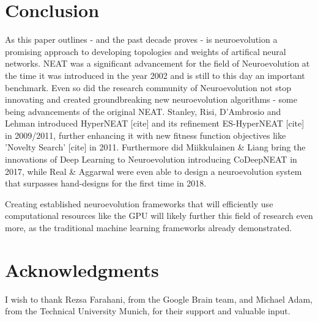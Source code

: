 \documentclass[journal, a4paper]{IEEEtran}
\begin{document}

\section{Conclusion}

As this paper outlines - and the past decade proves - is neuroevolution a promising approach to developing topologies and weights of artifical neural networks. NEAT was a significant advancement for the field of Neuroevolution at the time it was introduced in the year 2002 and is still to this day an important benchmark. Even so did the research community of Neuroevolution not stop innovating and created groundbreaking new neuroevolution algorithms - some being advancements of the original NEAT. Stanley, Risi, D'Ambrosio and Lehman introduced HyperNEAT [cite] and its refinement ES-HyperNEAT [cite] in 2009/2011, further enhancing it with new fitness function objectives like 'Novelty Search' [cite] in 2011. Furthermore did Miikkulainen \& Liang bring the innovations of Deep Learning to Neuroevolution introducing CoDeepNEAT in 2017, while Real \& Aggarwal were even able to design a neuroevolution system that surpasses hand-designs for the first time in 2018.

Creating established neuroevolution frameworks that will efficiently use computational resources like the GPU will likely further this field of research even more, as the traditional machine learning frameworks already demonstrated.




\section{Acknowledgments}

I wish to thank Rezsa Farahani, from the Google Brain team, and Michael Adam, from the Technical University Munich, for their support and valuable input.



\end{document}
